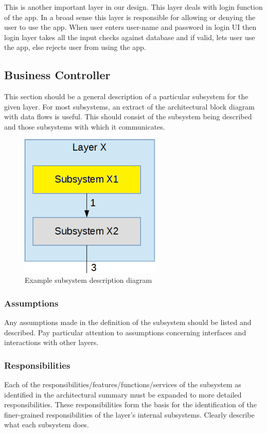 This is another important layer in our design. This layer deals with login function of the app. In a broad sense this layer is responsible for allowing or denying the user to use the app. When user enters user-name and password in login UI then login layer takes all the input checks against database and if valid, lets user use the app, else rejects user from using the app.

\subsection{Business Controller}
This section should be a general description of a particular subsystem for the given layer. For most subsystems, an extract of the architectural block diagram with data flows is useful. This should consist of the subsystem being described and those subsystems with which it communicates.

\begin{figure}[h!]
	\centering
 	\includegraphics[width=0.60\textwidth]{images/subsystem}
 \caption{Example subsystem description diagram}
\end{figure}

\subsubsection{Assumptions}
Any assumptions made in the definition of the subsystem should be listed and described. Pay particular attention to assumptions concerning interfaces and interactions with other layers.

\subsubsection{Responsibilities}
Each of the responsibilities/features/functions/services of the subsystem as identified in the architectural summary must be expanded to more detailed responsibilities. These responsibilities form the basis for the identification of the finer-grained responsibilities of the layer's internal subsystems. Clearly describe what each subsystem does.

